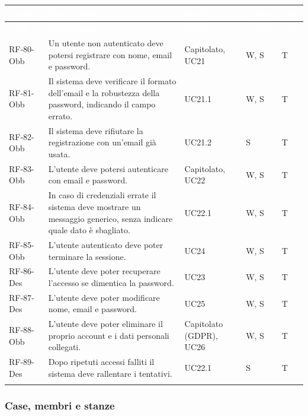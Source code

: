 \documentclass[12pt,a4paper]{article}
\newcommand{\thc}[1]{\textcolor{white}{\textbf{#1}}}
\newcommand{\rl}{\\ \arrayrulecolor{bfline}\hline}
\begin{document}
\begin{longtable}{>{\raggedright\arraybackslash}p{}>{\raggedright\arraybackslash}p{}>{\raggedright\arraybackslash}p{}>{\raggedright\arraybackslash}p{}>{\centering\arraybackslash}p{}}
\rowcolor{bfblue}\thc{Codice} & \thc{Descrizione} & \thc{Fonti} & \thc{Comp.} & \thc{Ver.} \\
\endfirsthead
\rowcolor{bfblue}\thc{Codice} & \thc{Descrizione} & \thc{Fonti} & \thc{Comp.} & \thc{Ver.} \\
\endhead
RF-80-Obb & Un utente non autenticato deve potersi registrare con nome, email e password. & Capitolato, UC21 & W, S & T \rl
RF-81-Obb & Il sistema deve verificare il formato dell'email e la robustezza della password, indicando il campo errato. & UC21.1 & W, S & T \rl
RF-82-Obb & Il sistema deve rifiutare la registrazione con un'email già usata. & UC21.2 & S & T \rl
RF-83-Obb & L'utente deve potersi autenticare con email e password. & Capitolato, UC22 & W, S & T \rl
RF-84-Obb & In caso di credenziali errate il sistema deve mostrare un messaggio generico, senza indicare quale dato è sbagliato. & UC22.1 & W, S & T \rl
RF-85-Obb & L'utente autenticato deve poter terminare la sessione. & UC24 & W, S & T \rl
RF-86-Des & L'utente deve poter recuperare l'accesso se dimentica la password. & UC23 & W, S & T \rl
RF-87-Des & L'utente deve poter modificare nome, email e password. & UC25 & W, S & T \rl
RF-88-Obb & L'utente deve poter eliminare il proprio account e i dati personali collegati. & Capitolato (GDPR), UC26 & W, S & T \rl
RF-89-Des & Dopo ripetuti accessi falliti il sistema deve rallentare i tentativi. & UC22.1 & S & T \rl
\end{longtable}

\subsubsection{Case, membri e stanze}
\end{document}

